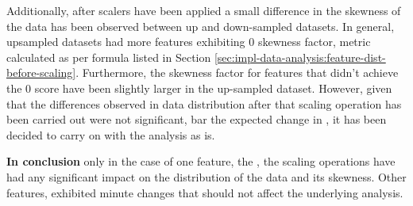 Additionally, after scalers have been applied a small difference in the skewness of the data has been observed between up and down-sampled datasets. In general, upsampled datasets had more features exhibiting 0 skewness factor, metric calculated as per formula listed in Section \ref{sec:impl-data-analysis:feature-dist-before-scaling}. Furthermore, the skewness factor for features that didn't achieve the 0 score have been slightly larger in the up-sampled dataset. 
However, given that the differences observed in data distribution after that scaling operation has been carried out were not significant, bar the expected change in \fileAgeInSec{}, it has been decided to carry on with the analysis as is.

\textbf{In conclusion} only in the case of one feature, the \fileAgeInSec{}, the scaling operations have had any significant impact on the distribution of the data and its skewness. Other features, exhibited minute changes that should not affect the underlying analysis.
\FloatBarrier